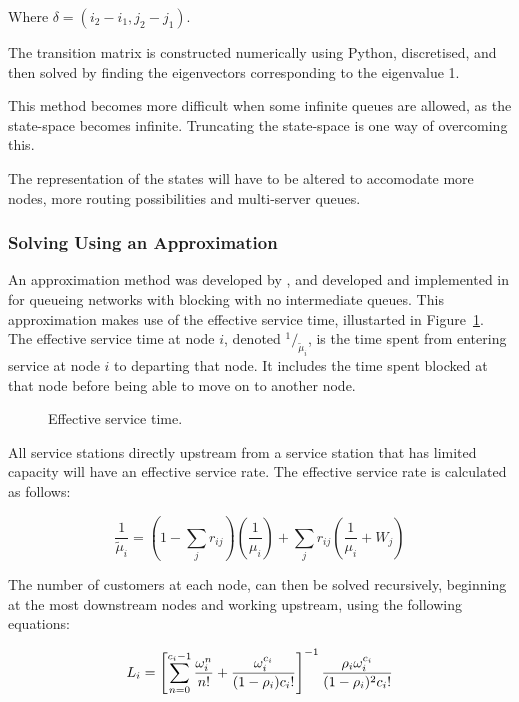 \documentclass{article}
\begin{document}
Where $\delta = (i_2-i_1, j_2-j_1)$.

The transition matrix is constructed numerically using Python, discretised, and then solved by finding the eigenvectors corresponding to the eigenvalue 1.

This method becomes more difficult when some infinite queues are allowed, as the state-space becomes infinite.
Truncating the state-space is one way of overcoming this.

The representation of the states will have to be altered to accomodate more nodes, more routing possibilities and multi-server queues.



\subsubsection{Solving Using an Approximation}
An approximation method was developed by \cite{takahashi80}, and developed and implemented in \cite{koizumietal05} for queueing networks with blocking with no intermediate queues.
This approximation makes use of the effective service time, illustarted in Figure~\ref{fig:effectiveservicetime}.
The effective service time at node $i$, denoted $^1 / _{\tilde{\mu}_i}$, is the time spent from entering service at node $i$ to departing that node.
It includes the time spent blocked at that node before being able to move on to another node.

\begin{figure}[H]
    
    \caption{Effective service time.}
    \label{fig:effectiveservicetime}
\end{figure}

All service stations directly upstream from a service station that has limited capacity will have an effective service rate.
The effective service rate is calculated as follows:

\begin{equation}
    \frac{1}{\tilde{\mu}_i} = \left( 1 - \sum_j r_{ij} \right) \left( \frac{1}{\mu_i} \right) + \sum_j r_{ij} \left( \frac{1}{\mu_i} + W_j \right)
\end{equation}

The number of customers at each node, can then be solved recursively, beginning at the most downstream nodes and working upstream, using the following equations:

\begin{equation} \label{eq:L}
    L_i = \left[ \sum_{n=0}^{c_i-1} {\omega_i^n \over n!} + {\omega_i^{c_i} \over (1 - \rho_i)c_i! } \right]^{-1} \frac{\rho_i \omega_i^{c_i}}{(1-\rho_i)^2 c_i!}
\end{equation}
\end{document}

